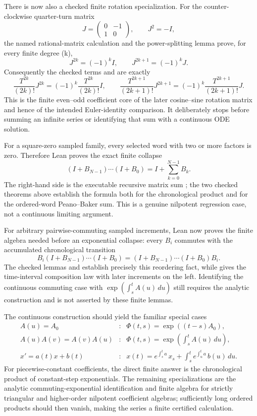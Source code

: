 \begin{theorem}
There is now also a checked finite rotation specialization.  For the
counter-clockwise quarter-turn matrix
\[
 J=\begin{pmatrix}0&-1\\1&0\end{pmatrix},
 \qquad J^2=-I,
\]
the named rational-matrix calculation 
and the power-splitting lemma  prove, for every finite
degree (k),
\[
 J^{2k}=(-1)^k I,
 \qquad
 J^{2k+1}=(-1)^kJ.
\]
Consequently the checked terms
 and
 are exactly
\[
 \frac{T^{2k}}{(2k)!}J^{2k}
   =(-1)^k\frac{T^{2k}}{(2k)!}I,
 \qquad
 \frac{T^{2k+1}}{(2k+1)!}J^{2k+1}
   =(-1)^k\frac{T^{2k+1}}{(2k+1)!}J.
\]
This is the finite even--odd coefficient core of the later
cosine--sine rotation matrix and hence of the intended Euler-identity
comparison.  It deliberately stops before summing an infinite series or
identifying that sum with a continuous ODE solution.

For a square-zero sampled family, every selected word with two or more
factors is zero. Therefore Lean proves the exact finite collapse
\[
 (I+B_{N-1})\cdots(I+B_0)
 = I+\sum_{k=0}^{N-1}B_k.
\]
The right-hand side is the executable recursive matrix sum
; the two checked theorems above establish the
formula both for the chronological product and for the ordered-word
Peano--Baker sum. This is a genuine nilpotent regression case, not a
continuous limiting argument.

For arbitrary pairwise-commuting sampled increments, Lean now proves the
finite algebra needed before an exponential collapse: every \(B_i\) commutes
with the accumulated chronological transition
\[
 B_i (I+B_{N-1})\cdots(I+B_0)
 =
 (I+B_{N-1})\cdots(I+B_0) B_i.
\]
The checked lemmas  and
 establish precisely this
reordering fact, while  gives the
time-interval composition law with later increments on the left. Identifying
the continuous commuting case with
\(\exp(\int_s^t A(u)\,du)\) still requires the analytic construction and is
not asserted by these finite lemmas.

The continuous construction should yield the familiar special cases
\[
 \begin{array}{rcl}
 A(u)=A_0&:&\Phi(t,s)=\exp((t-s)A_0),\\[2mm]
 A(u)A(v)=A(v)A(u)&:&
 \Phi(t,s)=\exp\!\left(\int_s^tA(u)\,du\right),\\[2mm]
 x'=a(t)x+b(t)&:&
 x(t)=e^{\int_s^t a}\,x_s+\int_s^t e^{\int_u^t a}\,b(u)\,du.
 \end{array}
\]
For piecewise-constant coefficients, the direct finite answer is the
chronological product of constant-step exponentials. The remaining
specializations are the analytic commuting-exponential identification and
finite algebra for strictly triangular and higher-order nilpotent coefficient
algebras; sufficiently long ordered products should then vanish, making the
series a finite certified calculation.
\end{theorem}

